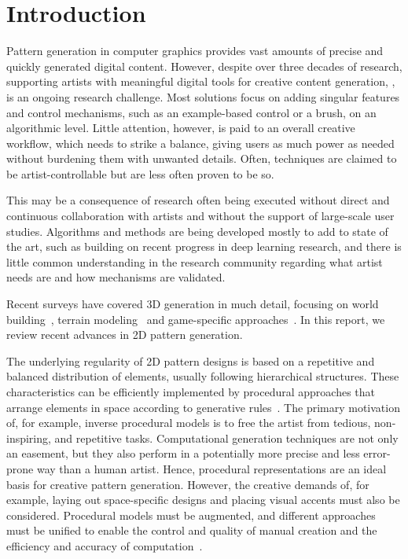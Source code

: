 \section{Introduction}
Pattern generation in computer graphics provides vast amounts of precise and quickly generated digital content. However, despite over three decades of research, supporting artists with meaningful digital tools for creative content generation, , is an ongoing research challenge. Most solutions focus on adding singular features and control mechanisms, such as an example-based control or a brush, on an algorithmic level. Little attention, however, is paid to an overall creative workflow, which needs to strike a balance, giving users as much power as needed without burdening them with unwanted details. Often, techniques are claimed to be artist-controllable but are less often proven to be so.

This may be a consequence of research often being executed without direct and continuous collaboration with artists and without the support of large-scale user studies. Algorithms and methods are being developed mostly to add to state of the art, such as building on recent progress in deep learning research, and there is little common understanding in the research community regarding what artist needs are and how mechanisms are validated.

Recent surveys have covered 3D generation in much detail, focusing on  world building~\cite{smelik_2014_aso, aliaga_2016_ipm}, terrain modeling~\cite{galin_2019_aro} and game-specific approaches~\cite{hendrikx_2013_pcg, togelius_2011_sbp}. In this report, we review recent advances in 2D pattern generation. 

The underlying regularity of 2D pattern designs is based on a repetitive and balanced distribution of elements, usually following hierarchical structures. These characteristics can be efficiently implemented by procedural approaches that arrange elements in space according to generative rules~\cite{stava_2010_ipm}. The primary motivation of, for example, inverse procedural models is to free the artist from tedious, non-inspiring, and repetitive tasks. Computational generation techniques are not only an easement, but they also perform in a potentially more precise and less error-prone way than a human artist. Hence, procedural representations are an ideal basis for creative pattern generation. However, the creative demands of, for example, laying out space-specific designs and placing visual accents must also be considered. Procedural models must be augmented, and different approaches must be unified to enable the control and quality of manual creation and the efficiency and accuracy of computation~\cite{gieseke_2017_ooo}. 


